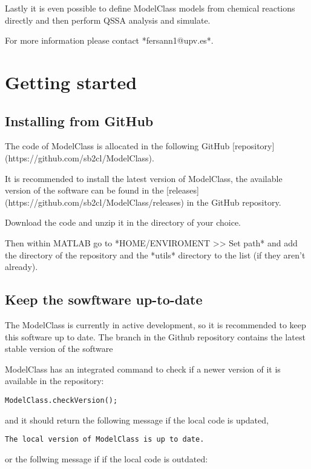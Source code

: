 \documentclass[11pt]{article}
\begin{document}
Lastly it is even possible to define ModelClass models from chemical reactions directly and then perform QSSA analysis and simulate.

For more information please contact *fersann1@upv.es*.

\section{Getting started}

\subsection{Installing from GitHub}

The code of ModelClass is allocated in the following GitHub [repository](https://github.com/sb2cl/ModelClass).

It is recommended to install the latest version of ModelClass, the available version of the software can be found in the [releases](https://github.com/sb2cl/ModelClass/releases) in the GitHub repository.

Download the code and unzip it in the directory of your choice.

Then within MATLAB go to *HOME/ENVIROMENT >> Set path* and add the directory of the repository and the *utils* directory to the list (if they aren't already).

\subsection{Keep the sowftware up-to-date}

The ModelClass is currently in active development, so it is recommended to keep this software up to date. The  branch in the Github repository contains the latest stable version of the software

ModelClass has an integrated command to check if a newer version of it is available in the repository:
\begin{lstlisting}
ModelClass.checkVersion();
\end{lstlisting}

and it should return the following message if the local code is updated,

\begin{lstlisting}
The local version of ModelClass is up to date.
\end{lstlisting}

or the follwing message if if the local code is outdated:
\end{document}
